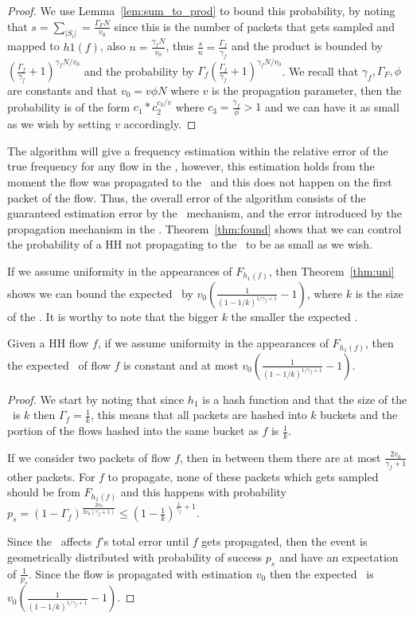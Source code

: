{\begin{proof}
We use Lemma~\ref{lem:sum_to_prod} to bound this probability, by noting that $s=\sum_{|S_i|}=\frac{\Gamma_F N}{v_0}$ since this is the number of packets that gets sampled and mapped to $h1(f)$, also $n=\frac{\gamma_f N}{v_0}$, thus $\frac{s}{n}=\frac{\Gamma_f}{\gamma_f}$ and the product is bounded by $(\frac{\Gamma_f}{\gamma_f} + 1)^{\gamma_f N /v_0}$ and the probability by $\Gamma_f(\frac{\Gamma_f}{\gamma_f} + 1)^{\gamma_f N /v_0}$. We recall that $\gamma_f, \Gamma_F, \phi$ are constants and that $v_0=v \phi N$  where $v$ is the propagation parameter, then the probability is of the form $c_1*c_2^{c_3/v}$ where $c_3=\frac{\gamma_f}{\phi}>1$ and we can have it as small as we wish by setting $v$ accordingly.
\end{proof}

}

The algorithm will give a frequency estimation within the relative error of the true frequency for any flow in the \cs, however, this estimation holds from the moment the flow was propagated to the \cs\ and this does not happen on the first packet of the flow. Thus, the overall error of the algorithm consists of the guaranteed estimation error by the \sea\ mechanism, and the error introduced by the propagation mechanism in the \sfa. Theorem~\ref{thm:found} shows that we can control the probability of a HH not propagating to the \cs\ to be as small as we wish.

If we assume uniformity in the appearances of $F_{h_1(f)}$, then Theorem~\ref{thm:uni} shows we can bound the expected \pe\ by $v_0\left(\frac{1}{(1-1/k)^{1/ \gamma_f+1}}-1\right)$, where $k$ is the size of the \sfa. It is worthy to note that the bigger $k$ the smaller the expected \pe.

\begin{theorem}
\label{thm:uni}
Given a HH flow $f$, if we assume uniformity in the appearances of $F_{h_1(f)}$, then the expected \pe\ of flow $f$ is constant and at most $v_0\left(\frac{1}{(1-1/k)^{1/ \gamma_f+1}}-1\right)$.
\end{theorem}
\begin{proof}
We start by noting that since $h_1$ is a hash function and that the size of the \sfa\ is $k$ then $\Gamma_f = \frac{1}{k}$, this means that all packets are hashed into $k$ buckets and the portion of the flows hashed into the same bucket as $f$ is $\frac{1}{k}$.

If we consider two packets of flow $f$, then in between them there are at most $\frac{2v_0}{\gamma_f+1}$ other packets. For $f$ to propagate, none of these packets which gets sampled should be from $F_{h_1(f)}$ and this happens with probability $p_s=(1-\Gamma_f)^{\frac{2v_0}{2v_0(\gamma_f+1)}}\leq(1-\frac{1}{k})^{\frac{1}{\gamma_f}+1}$.

Since the \pe\ affects $f$'s total error until $f$ gets propagated, then the event is geometrically distributed with probability of success $p_s$ and have an expectation of $\frac{1}{p_s}$. Since the flow is propagated with estimation $v_0$ then the expected \pe\ is $v_0\left(\frac{1}{(1-1/k)^{1/ \gamma_f+1}}-1\right)$.
\end{proof}



